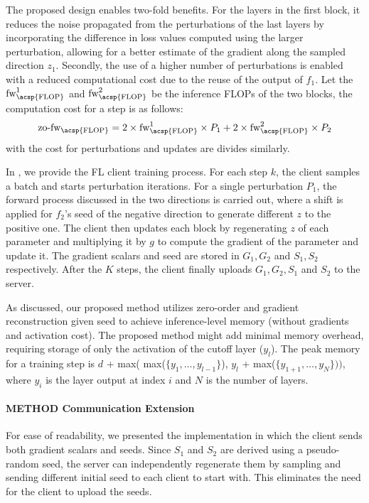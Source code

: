 The proposed design enables two-fold benefits. For the layers in the first block, it reduces the noise propagated from the perturbations of the last layers by incorporating the difference in loss values computed using the larger perturbation, allowing for a better estimate of the gradient along the sampled direction $z_{1}$. Secondly, the use of a higher number of perturbations is enabled with a reduced computational cost due to the reuse of the output of $f_{1}$. Let the $\text{fw}^{1}_{\text{\acsp{FLOP}}}$ and $\text{fw}^{2}_{\text{\acsp{FLOP}}}$ be the inference \acp{FLOP} of the two blocks, the computation cost for a step is as follows:
\begin{equation}
    \text{zo-fw}_{\text{\acsp{FLOP}}} = 2 \times \text{fw}^{1}_{\text{\acsp{FLOP}}} \times P_{1} + 2 \times \text{fw}^{2}_{\text{\acsp{FLOP}}} \times P_{2}
\end{equation}
with the cost for perturbations and updates are divides similarly. 


In , we provide the \ac{FL} client training process. %
For each step $k$, the client samples a batch and starts perturbation iterations.  For a single perturbation $P_{1}$, the forward process discussed in the two directions is carried out, where a shift is applied for $f_{2}$'s seed of the negative direction to generate different $z$ to the positive one. The client then updates each block by regenerating $z$ of each parameter and multiplying it by $g$ to compute the gradient of the parameter and update it. The gradient scalars and seed are stored in $G_{1}, G_{2}$ and $S_{1}, S_{2}$ respectively. After the $K$ steps, the client finally uploads $G_{1},  G_{2}, S_{1}$ and $S_{2}$ to the server.








As discussed, our proposed method utilizes zero-order and gradient reconstruction given seed \cite{malladi2023fine} to achieve inference-level memory (without gradients and activation cost). The proposed method might add minimal memory overhead, requiring storage of only the activation of the cutoff layer ($y_{l}$). The peak memory for a training step is  
$d$ + max( max($\{y_{1}, \dots, y_{l-1}\}$), $y_{l}$ + max($\{y_{1+1}, \dots, y_{N}\}))$, where $y_{i}$ is the layer output at index $i$ and $N$ is the number of layers.

\paragraph{\ac{METHOD} Communication Extension}

For ease of readability, we presented the implementation in which the client sends both gradient scalars and seeds. Since $S_{1}$ and $S_{2}$ are derived using a pseudo-random seed, the server can independently regenerate them by sampling and sending different initial seed to each client to start with. This eliminates the need for the client to upload the seeds.


